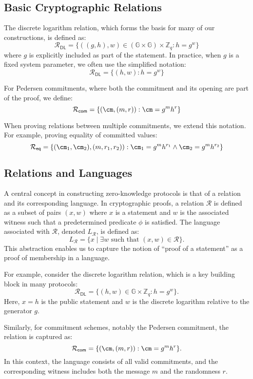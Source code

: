 \subsection{Basic Cryptographic Relations}
The discrete logarithm relation, which forms the basis for many of our constructions, is defined as:
\[
    \mathcal{R}_{\mathsf{DL}} = \{((g,h),w) \in (\mathbb{G} \times \mathbb{G}) \times \mathbb{Z}_q : h = g^w\}
\]
where $g$ is explicitly included as part of the statement. In practice, when $g$ is a fixed system parameter, we often use the simplified notation:
\[
    \mathcal{R}_{\mathsf{DL}} = \{(h,w): h = g^w\}
\]

For Pedersen commitments, where both the commitment and its opening are part of the proof, we define:
\[
    \mathcal{R}_{\mathsf{com}} = \{(\cm,(m,r)) : \cm = g^m h^r\}
\]

When proving relations between multiple commitments, we extend this notation. For example, proving equality of committed values:
\[
    \mathcal{R}_{\mathsf{eq}} = \{(\cm_1, \cm_2),(m,r_1,r_2)) : 
    \cm_1 = g^m h^{r_1} \land \cm_2 = g^m h^{r_2}\}
\]


\subsection{Relations and Languages}

A central concept in constructing zero-knowledge protocols is that of a relation and its corresponding language. In cryptographic proofs, a relation $\mathcal{R}$ is defined as a subset of pairs $(x, w)$ where $x$ is a statement and $w$ is the associated witness such that a predetermined predicate $\phi$ is satisfied. The language associated with $\mathcal{R}$, denoted $L_\mathcal{R}$, is defined as:
\[
L_\mathcal{R} = \{ x \mid \exists w \text{ such that } (x, w) \in \mathcal{R} \}.
\]
This abstraction enables us to capture the notion of “proof of a statement” as a proof of membership in a language.

For example, consider the discrete logarithm relation, which is a key building block in many protocols:
\[
\mathcal{R}_{\mathsf{DL}} = \{ (h, w) \in \mathbb{G} \times \mathbb{Z}_q : h = g^w \}.
\]
Here, $x = h$ is the public statement and $w$ is the discrete logarithm relative to the generator $g$.

Similarly, for commitment schemes, notably the Pedersen commitment, the relation is captured as:
\[
\mathcal{R}_{\mathsf{com}} = \{ (\cm, (m, r)) : \cm = g^m h^r \}.
\]
In this context, the language consists of all valid commitments, and the corresponding witness includes both the message $m$ and the randomness $r$.


















